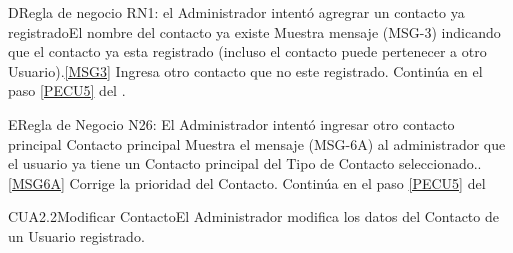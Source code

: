         \begin{UCtrayectoriaA}{D}{Regla de negocio RN1: el Administrador intentó agregrar un contacto ya registrado}{El nombre del contacto ya existe}
                        \UCpaso Muestra mensaje (MSG-3) indicando que el contacto ya esta registrado (incluso el contacto puede pertenecer a otro Usuario).\ref{MSG3}
			\UCpaso[\UCactor] Ingresa otro contacto que no este registrado.
			\UCpaso Continúa en el paso \ref{PECU5} del .
	\end{UCtrayectoriaA}

        \begin{UCtrayectoriaA}{E}{Regla de Negocio N26: El Administrador intentó ingresar otro contacto principal }{Contacto principal}
                        \UCpaso Muestra el mensaje (MSG-6A) al administrador que el usuario ya tiene un Contacto principal del Tipo de Contacto seleccionado..\ref{MSG6A}
			\UCpaso[\UCactor] Corrige la prioridad del Contacto.
			\UCpaso Continúa en el paso \ref{PECU5} del 
	\end{UCtrayectoriaA}

	\begin{UseCase}{CUA2.2}{Modificar Contacto}{El Administrador modifica los datos del Contacto de un Usuario registrado.}
	\end{UseCase}

